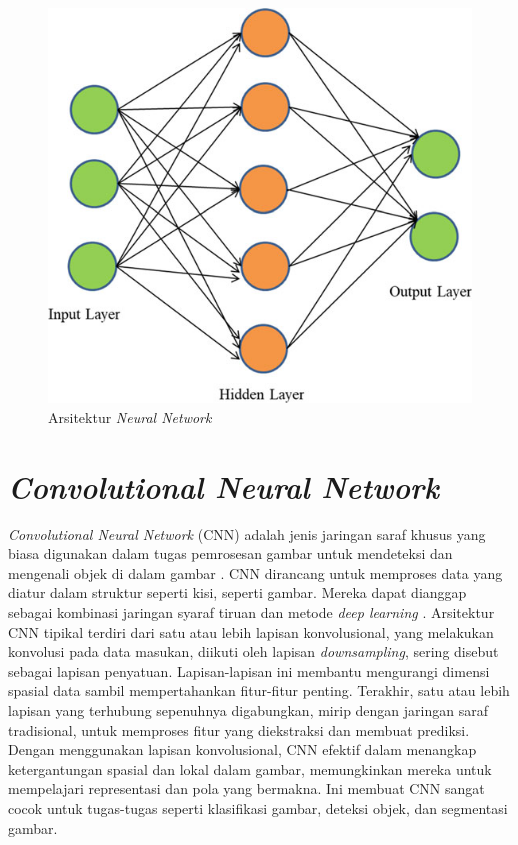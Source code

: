 \begin{figure}[H]
  \centering
  \includegraphics[scale=1]{gambar/arsitekturann.png}
  \caption{Arsitektur \emph{Neural Network} \parencite{Janiesch}}
  \label{fig:arsiann}
\end{figure}

\section{\emph{Convolutional Neural Network}}
\label{sec:cnn}

\emph{Convolutional Neural Network} (CNN) adalah jenis jaringan saraf khusus yang biasa digunakan dalam tugas pemrosesan gambar untuk mendeteksi dan mengenali objek di dalam gambar \parencite{Mehindra}. CNN dirancang untuk memproses data yang diatur dalam struktur seperti kisi, seperti gambar. Mereka dapat dianggap sebagai kombinasi jaringan syaraf tiruan dan metode \emph{deep learning} \parencite{Fonda}. Arsitektur CNN tipikal terdiri dari satu atau lebih lapisan konvolusional, yang melakukan konvolusi pada data masukan, diikuti oleh lapisan \emph{downsampling}, sering disebut sebagai lapisan penyatuan. Lapisan-lapisan ini membantu mengurangi dimensi spasial data sambil mempertahankan fitur-fitur penting. Terakhir, satu atau lebih lapisan yang terhubung sepenuhnya digabungkan, mirip dengan jaringan saraf tradisional, untuk memproses fitur yang diekstraksi dan membuat prediksi. Dengan menggunakan lapisan konvolusional, CNN efektif dalam menangkap ketergantungan spasial dan lokal dalam gambar, memungkinkan mereka untuk mempelajari representasi dan pola yang bermakna. Ini membuat CNN sangat cocok untuk tugas-tugas seperti klasifikasi gambar, deteksi objek, dan segmentasi gambar.

